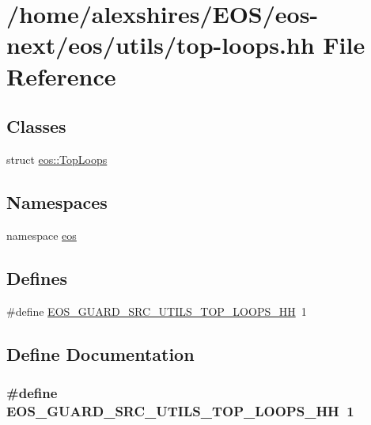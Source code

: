 \hypertarget{top-loops_8hh}{
\section{/home/alexshires/EOS/eos-\/next/eos/utils/top-\/loops.hh File Reference}
\label{top-loops_8hh}
}
\subsection*{Classes}
\begin{DoxyCompactItemize}
\item 
struct \hyperlink{structeos_1_1TopLoops}{eos::TopLoops}
\end{DoxyCompactItemize}
\subsection*{Namespaces}
\begin{DoxyCompactItemize}
\item 
namespace \hyperlink{namespaceeos}{eos}
\end{DoxyCompactItemize}
\subsection*{Defines}
\begin{DoxyCompactItemize}
\item 
\#define \hyperlink{top-loops_8hh_abb46b9f7994015fef635d5d0186ca58d}{EOS\_\-GUARD\_\-SRC\_\-UTILS\_\-TOP\_\-LOOPS\_\-HH}~1
\end{DoxyCompactItemize}


\subsection{Define Documentation}
\hypertarget{top-loops_8hh_abb46b9f7994015fef635d5d0186ca58d}{
\subsubsection[{EOS\_\-GUARD\_\-SRC\_\-UTILS\_\-TOP\_\-LOOPS\_\-HH}]{\setlength{\rightskip}{0pt plus 5cm}\#define EOS\_\-GUARD\_\-SRC\_\-UTILS\_\-TOP\_\-LOOPS\_\-HH~1}}
\label{top-loops_8hh_abb46b9f7994015fef635d5d0186ca58d}
